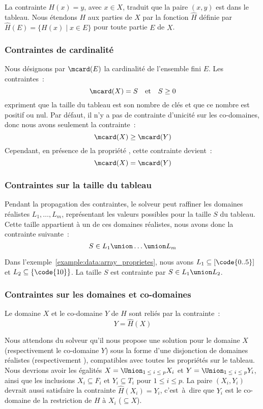 La contrainte $H(x) = y$, avec $x \in X$, traduit que la paire $(x, y)$ est dans
le tableau. Nous étendons $H$ aux parties de $X$ par la fonction $\hat{H}$
définie par $\hat{H}(E) = \{H(x) \;\vert\; x \in E\}$ pour toute partie $E$ de
$X$.

\subsubsection{Contraintes de cardinalité}

Nous désignons par $\mcard(E)$ la cardinalité de l'ensemble fini $E$. Les
con\-train\-tes~:
%
$$\mcard(X) = S \quad\mathrm{et}\quad S \geq 0$$
%
expriment que la taille du tableau est son nombre de clés et que ce nombre est
positif ou nul. Par défaut, il n'y a pas de contrainte d'unicité sur les
co-domaines, donc nous avons seulement la contrainte~:
%
$$\mcard(X) \geq \mcard(Y)$$
%
Cependant, en présence de la propriété , cette contrainte
devient~:
%
$$\mcard(X) = \mcard(Y)$$

\subsubsection{Contraintes sur la taille du tableau}

Pendant la propagation des contraintes, le solveur peut raffiner les domaines
réalistes $L_1, \dots, L_m$, représentant les valeurs possibles pour la taille
$S$ du tableau. Cette taille appartient à un de ces domaines réalistes, nous
avons donc la contrainte suivante~:
%
$$S \in L_1 \union \dots \union L_m$$

Dans l'exemple~\ref{example:data:array_proprietes}, nous avons $L_1 \subseteq
[\code{0..5}]$ et $L_2 \subseteq \{\code{10}\}$. La taille $S$ est contrainte
par $S \in L_1 \union L_2$.

\subsubsection{Contraintes sur les domaines et co-domaines}

Le domaine $X$ et le co-domaine $Y$ de $H$ sont reliés par la contrainte~:
%
$$Y = \hat{H}(X)$$

Nous attendons du solveur qu'il nous propose une solution pour le domaine $X$
(respectivement le co-domaine $Y$) sous la forme d'une disjonction de domaines
réalistes  (respectivement ), compatibles avec toutes les propriétés sur le tableau. Nous
devrions avoir les égalités $X = \Union_{1 \;\leq\; i \;\leq\; p} X_i$ et $Y =
\Union_{1 \;\leq\; i \;\leq\; p} Y_i$, ainsi que les inclusions $X_i \subseteq
F_i$ et $Y_i \subseteq T_i$ pour $1 \leq i \leq p$. La paire $(X_i, Y_i)$
devrait aussi satisfaire la contrainte $\hat{H}(X_i) = Y_i$, c'est~à~dire que
$Y_i$ est le co-domaine de la restriction de $H$ à $X_i$ ($\subseteq X$).

